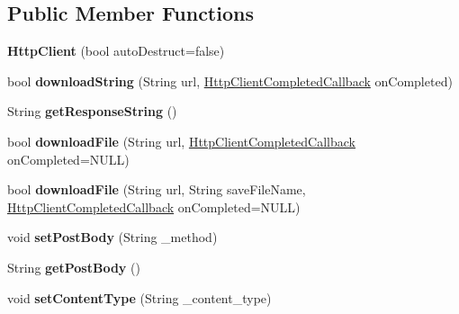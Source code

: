 \subsection*{Public Member Functions}
\begin{DoxyCompactItemize}
\item 
\hypertarget{class_http_client_a1283ada5645c88489bb04b8967d95f38}{}{\bfseries Http\+Client} (bool auto\+Destruct=false)\label{class_http_client_a1283ada5645c88489bb04b8967d95f38}

\item 
\hypertarget{class_http_client_acff314267ac228a0fda846164cc9b35c}{}bool {\bfseries download\+String} (String url, \hyperlink{class_delegate}{Http\+Client\+Completed\+Callback} on\+Completed)\label{class_http_client_acff314267ac228a0fda846164cc9b35c}

\item 
\hypertarget{class_http_client_ad2ea502457a5b753ee5cbe9a65ee9d2c}{}String {\bfseries get\+Response\+String} ()\label{class_http_client_ad2ea502457a5b753ee5cbe9a65ee9d2c}

\item 
\hypertarget{class_http_client_a416faa1d1a175d8e3662a5cf48e7069c}{}bool {\bfseries download\+File} (String url, \hyperlink{class_delegate}{Http\+Client\+Completed\+Callback} on\+Completed=N\+U\+L\+L)\label{class_http_client_a416faa1d1a175d8e3662a5cf48e7069c}

\item 
\hypertarget{class_http_client_a5bc8fe1f56d493658f0535752256cc46}{}bool {\bfseries download\+File} (String url, String save\+File\+Name, \hyperlink{class_delegate}{Http\+Client\+Completed\+Callback} on\+Completed=N\+U\+L\+L)\label{class_http_client_a5bc8fe1f56d493658f0535752256cc46}

\item 
\hypertarget{class_http_client_ab423ad5713fb9f2569443c18c4b51d9a}{}void {\bfseries set\+Post\+Body} (String \+\_\+method)\label{class_http_client_ab423ad5713fb9f2569443c18c4b51d9a}

\item 
\hypertarget{class_http_client_a79395f514b78c5f0366571ed613a3151}{}String {\bfseries get\+Post\+Body} ()\label{class_http_client_a79395f514b78c5f0366571ed613a3151}

\item 
\hypertarget{class_http_client_a8faf4657baf0255f1b504fe771708acb}{}void {\bfseries set\+Content\+Type} (String \+\_\+content\+\_\+type)\label{class_http_client_a8faf4657baf0255f1b504fe771708acb}


\end{DoxyCompactItemize}
